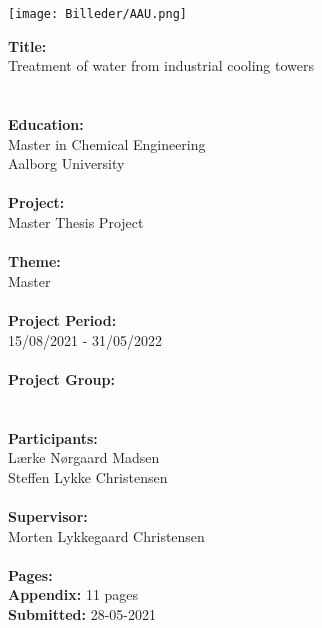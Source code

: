 \begin{minipage}[t]{0.6\textwidth}
\texttt{[image: Billeder/AAU.png]}

\vspace{0.5cm}

\textbf{Title:} \\
\hspace*{0.1cm} Treatment of water from industrial cooling towers\\

\\
\\\textbf{Education:} 
\\\hspace*{0.2cm} Master in Chemical Engineering
\\\hspace*{0.2cm} Aalborg University \\
\\
\textbf{Project:} \\
\hspace*{0.2cm} Master Thesis Project  
\\
\\\textbf{Theme:} 
\\\hspace*{0.2cm} Master \\
\\
\textbf{Project Period:} \\ 
\hspace*{0.2cm} 15/08/2021 - 31/05/2022 \\
\\
\textbf{Project Group:} \\
\hspace*{0.2cm} \\
\\
\textbf{Participants:} \\
\hspace*{0.2cm} Lærke Nørgaard Madsen \\
\hspace*{0.2cm} Steffen Lykke Christensen  \\
\\

\textbf{Supervisor:}\\
\hspace*{0.2cm} Morten Lykkegaard Christensen
\\
\\
\textbf{Pages:} \pageref{mylastpage}\\
\textbf{Appendix:} 11 pages \\
\textbf{Submitted:} 28-05-2021
\end{minipage}
